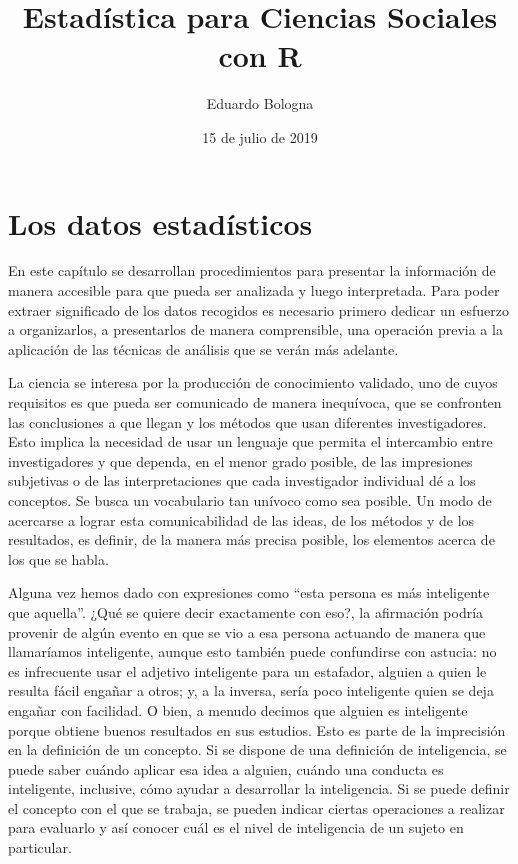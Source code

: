 \documentclass[]{book}
\title{Estadística para Ciencias Sociales con R}
\author{Eduardo Bologna}
\date{15 de julio de 2019}
\begin{document}
\maketitle

{
\setcounter{tocdepth}{1}
\tableofcontents
}
\hypertarget{los-datos-estadisticos}{%
\chapter{Los datos estadísticos}\label{los-datos-estadisticos}}

En este capítulo se desarrollan procedimientos para presentar la información de manera accesible para que pueda ser analizada y luego interpretada. Para poder extraer significado de los datos recogidos es necesario primero dedicar un esfuerzo a organizarlos, a presentarlos de manera comprensible, una operación previa a la aplicación de las técnicas de análisis que se verán más adelante.

La ciencia se interesa por la producción de conocimiento validado, uno de cuyos requisitos es que pueda ser comunicado de manera inequívoca, que se confronten las conclusiones a que llegan y los métodos que usan diferentes investigadores. Esto implica la necesidad de usar un lenguaje que permita el intercambio entre investigadores y que dependa, en el menor grado posible, de las impresiones subjetivas o de las interpretaciones que cada investigador individual dé a los conceptos. Se busca un vocabulario tan unívoco como sea posible. Un modo de acercarse a lograr esta comunicabilidad de las ideas, de los métodos y de los resultados, es definir, de la manera más precisa posible, los elementos acerca de los que se habla.

Alguna vez hemos dado con expresiones como ``esta persona es más inteligente que aquella''. ¿Qué se quiere decir exactamente con eso?, la afirmación podría provenir de algún evento en que se vio a esa persona actuando de manera que llamaríamos inteligente, aunque esto también puede confundirse con astucia: no es infrecuente usar el adjetivo inteligente para un estafador, alguien a quien le resulta fácil engañar a otros; y, a la inversa, sería poco inteligente quien se deja engañar con facilidad. O bien, a menudo decimos que alguien es inteligente porque obtiene buenos resultados en sus estudios. Esto es parte de la imprecisión en la definición de un concepto. Si se dispone de una definición de inteligencia, se puede saber cuándo aplicar esa idea a alguien, cuándo una conducta es inteligente, inclusive, cómo ayudar a desarrollar la inteligencia. Si se puede definir el concepto con el que se trabaja, se pueden indicar ciertas operaciones a realizar para evaluarlo y así conocer cuál es el nivel de inteligencia de un sujeto en particular.
\end{document}
